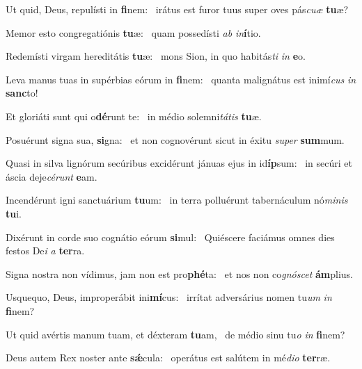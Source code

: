 \item Ut quid, Deus, repulísti in \textbf{fi}nem:~\psstar{} irátus est furor tuus super oves pás\textit{cuæ} \textbf{tu}æ?

\item Memor esto congregatiónis \textbf{tu}æ:~\psstar{} quam possedísti \textit{ab} \textit{in}\textbf{í}tio.

\item Redemísti virgam hereditátis \textbf{tu}æ:~\psstar{} mons Sion, in quo habitás\textit{ti} \textit{in} \textbf{e}o.

\item Leva manus tuas in supérbias eórum in \textbf{fi}nem:~\psstar{} quanta malignátus est inimí\textit{cus} \textit{in} \textbf{sanc}to!

\item Et gloriáti sunt qui o\textbf{dé}runt te:~\psstar{} in médio solemni\textit{tátis} \textbf{tu}æ.

\item Posuérunt signa sua, \textbf{si}gna:~\psstar{} et non cognovérunt sicut in éxitu \textit{super} \textbf{sum}mum.

\item Quasi in silva lignórum secúribus excidérunt jánuas ejus in id\textbf{íp}sum:~\psstar{} in secúri et áscia deje\textit{cérunt} \textbf{e}am.

\item Incendérunt igni sanctuárium \textbf{tu}um:~\psstar{} in terra polluérunt tabernáculum nó\textit{minis} \textbf{tu}i.

\item Dixérunt in corde suo cognátio eórum \textbf{si}mul:~\psstar{} Quiéscere faciámus omnes dies festos De\textit{i} \textit{a} \textbf{ter}ra.

\item Signa nostra non vídimus, jam non est pro\textbf{phé}ta:~\psstar{} et nos non co\textit{gnóscet} \textbf{ám}plius.

\item Usquequo, Deus, improperábit ini\textbf{mí}cus:~\psstar{} irrítat adversárius nomen tu\textit{um} \textit{in} \textbf{fi}nem?

\item Ut quid avértis manum tuam, et déxteram \textbf{tu}am,~\psstar{} de médio sinu tu\textit{o} \textit{in} \textbf{fi}nem?

\item Deus autem Rex noster ante \textbf{sǽ}cula:~\psstar{} operátus est salútem in mé\textit{dio} \textbf{ter}ræ.


